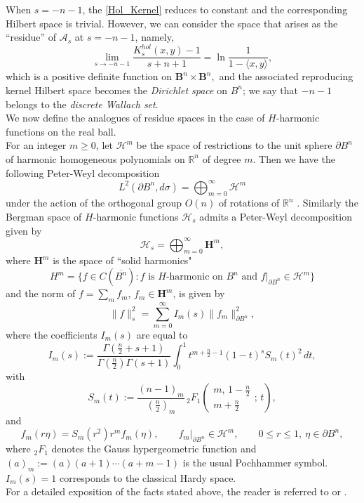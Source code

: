 \documentclass{article}
\theoremstyle{boldremark}
\renewcommand\[{\begin{equation}}
\renewcommand\]{\end{equation}}
\theoremstyle{definition}
\numberwithin{equation}{section}
\begin{document}
When $s = -n-1$, the \eqref{Hol_Kernel} reduces to constant and the corresponding Hilbert space is trivial.
However, we can consider the space that arises as the ``residue'' of $\mathcal{A}_s$ at $s = -n-1$, namely, 
$$
\lim_{s \rightarrow-n-1}\frac{K^{hol}_s(x,y)-1}{s+n+1} = \ln{\frac{1}{1-\langle x, y\rangle}},
$$
which is a positive definite function on $\textbf{B}^n \times \textbf{B}^n,$ and the associated reproducing kernel Hilbert space becomes the \textit{Dirichlet space} on $B^n$; we say that $-n-1$ belongs to the \textit{discrete Wallach set}. \\

We now define the analogues of residue spaces in the case of $H$-harmonic functions on the real ball.\\
For an integer $m \geq 0$, let $\mathcal{H}^m$ be the space of restrictions to the unit sphere $\partial B^n$ of harmonic homogeneous polynomials on $\mathbb{R}^n$ of degree $m$. Then we have the following Peter-Weyl decomposition 
\begin{equation}
    L^2(\partial B^n, d\sigma) = \bigoplus_{m=0}^\infty \mathcal{H}^m
\end{equation}
under the action of the orthogonal group $O(n)$ of rotations of $\mathbb{R}^n$ \cite[Chapter~5]{Axler}.
Similarly the Bergman space of $H$-harmonic functions $\mathcal{H}_s$ admits a Peter-Weyl decomposition given by
\begin{equation}
    \mathcal{H}_s = \bigoplus_{m=0}^\infty \textbf{{H}}^m,
\end{equation}
where $\textbf{H}^m$ is the space of ``solid harmonics"
$$
H^m = \{ f \in C(\overline{B^n}) : f \text{ is } H\text{-harmonic on } B^n
\text{ and } f|_{\partial B^n} \in \mathcal{H}^m \}
$$
and the norm of $f = \sum_mf_m$, $f_m\in\textbf{H}^m$, is given by 
\begin{equation}
    \|f\|_s^2 = \sum_{m=0}^\infty I_m(s) \|f_m\|^2_{\partial B^n},
\end{equation}
where the coefficients $I_m(s)$ are equal to
\begin{equation}
I_m(s) := \frac{\Gamma\left(\frac{n}{2}+s+1\right) }{\Gamma\left(\frac{n}{2}\right) \Gamma(s + 1)} \int_0^1 t^{m + \frac{n}{2} - 1} (1 - t)^s S_m(t)^2 \, dt,
\end{equation}
with 
$$
S_m(t) := \frac{(n-1)_m}{\left(\frac{n}{2}\right)_m} \, {}_2F_1\left(\begin{matrix} m,\, 1 - \frac{n}{2} \\ m + \frac{n}{2} \end{matrix} ;\, t \right),
$$
and
$$
f_m(r\eta)=S_m(r^2)r^m f_m(\eta), 
\qquad f_m|_{\partial B^n}\in \mathcal{H}^m, 
\qquad 0\le r\le 1,\ \eta\in \partial B^n,
$$
where $_2F_1$ denotes the Gauss hypergeometric function and $(a)_m := (a)(a+1)\cdots(a+m-1)$ is the usual Pochhammer symbol. $I_m(s)=1$ corresponds to the classical Hardy space.\\
For a detailed exposition of the facts stated above, the reader is referred to \cite[Chapter~10]{Stoll2016} or \cite{Stoll2019}.
\end{document}
